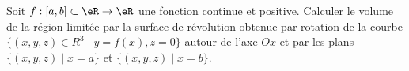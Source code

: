 
\begin{exercice}\label{exoIntMult0011}

Soit $f:[a,b] \subset \eR \rightarrow \eR$ une fonction continue et positive. 
Calculer le volume de la région limitée par la surface de révolution 
obtenue par rotation de la courbe $\{ (x,y,z) \in R^3 \mid  y=f(x), z=0 \}$
autour de l'axe $Ox$ et par les plans $\{ (x,y,z) \mid x=a \}$ et $\{ 
(x,y,z) \mid x=b \}$.

\end{exercice}
